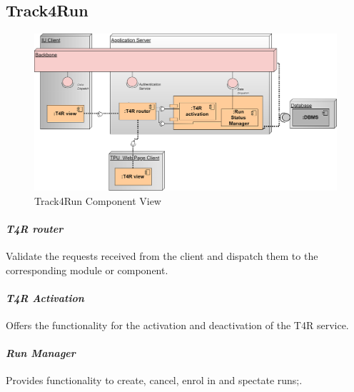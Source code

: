 \subsection{Track4Run}
\label{subsect:T4RComponentView}
\begin{figure}[H]
\caption{Track4Run Component View}
\centering
\includegraphics[width = \textwidth]{sections/architecturalDesign/T4RDiagram.png}
\end{figure}
\paragraph{\textit{T4R router}} Validate the requests received from the client and dispatch them to the corresponding module or component.
\paragraph{\textit{T4R Activation}} Offers the functionality for the activation and deactivation of the T4R service.
\paragraph{\textit{Run Manager}} Provides functionality to create, cancel, enrol in and spectate runs;.
\clearpage
